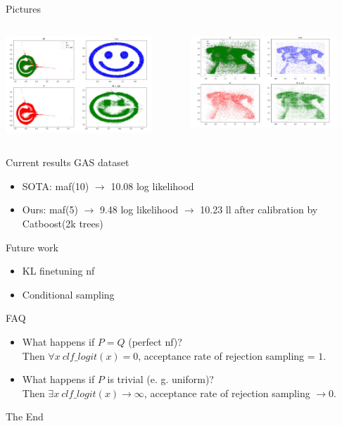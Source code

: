 \documentclass{beamer}
\begin{document}
\begin{frame}{Pictures}
  \begin{columns}[T] %
    \begin{column}{.48\textwidth}
      \includegraphics[width=5.5cm]{imgs/smile.jpeg}
    \end{column}%
    \hfill%
    \begin{column}{.48\textwidth}
      \includegraphics[width=5.5cm]{imgs/dog.jpeg}
    \end{column}%
  \end{columns}
\end{frame}

\begin{frame}{Current results}
  GAS dataset
  \begin{itemize}
    \item SOTA: maf(10) $\to$ 10.08 log likelihood
    \item Ours: maf(5) $\to$ 9.48 log likelihood $\to$ 10.23 ll after calibration by Catboost(2k trees)
  \end{itemize}
\end{frame}

\begin{frame}{Future work}
  \begin{itemize}
    \item KL finetuning nf
    \item Conditional sampling
  \end{itemize}
\end{frame}

\begin{frame}{FAQ}
  \begin{itemize}
    \item What happens if $P = Q$ (perfect nf)? \\
    Then $\forall x ~ clf\_logit(x) = 0$, acceptance rate of rejection sampling = $1$.
    \item What happens if $P$ is trivial (e. g. uniform)? \\
    Then $\exists x ~ clf\_logit(x) \to \infty$, acceptance rate of rejection sampling $\to 0$.
  \end{itemize}
\end{frame}

\begin{frame}
\huge{\centerline{The End}}
\end{frame}
\end{document}
